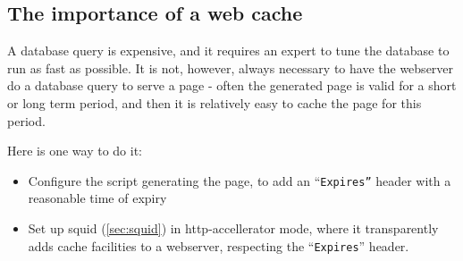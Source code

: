 \subsection{The importance of a web cache}
\label{sec:the-importance-of-a-web-cache}

A database query is expensive, and it requires an expert to tune the
database to run as fast as possible.  It is not, however, always
necessary to have the webserver do a database query to serve a page -
often the generated page is valid for a short or long term period,
and then it is relatively easy to cache the page for this period.

Here is one way to do it:

\begin{itemize}
\item Configure the script generating the page, to add an
  ``\texttt{Expires''} header with a reasonable time of expiry
\item Set up squid (\vref{sec:squid}) in http-accellerator mode, where
  it transparently adds cache facilities to a webserver, respecting
  the ``\texttt{Expires}'' header.
\end{itemize}

